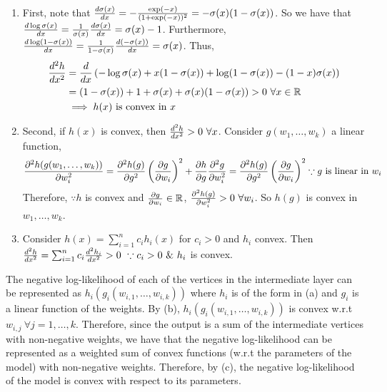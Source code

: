 

\begin{enumerate}
    \item First, note that $\odv{\sigma(x)}{x} = -\frac{\exp(-x)}{(1 + \exp(-x))^2} = -\sigma(x)(1 - \sigma(x))$. So we have that $\odv{\log\sigma(x)}{x} = \frac{1}{\sigma(x)}\odv{\sigma(x)}{x} = \sigma(x) - 1$. Furthermore, $\odv{\log(1-\sigma(x))}{x} = \frac{1}{1 - \sigma(x)}\odv{(-\sigma(x))}{x} = \sigma(x)$. Thus,
    \begin{align*}
        \odv[2]{h}{x} &= \odv{}{x} \left( -\log\sigma(x) + x(1 - \sigma(x)) +\log(1 - \sigma(x)) - (1-x) \sigma(x)  \right)\\
        &= (1 - \sigma(x)) + 1 + \sigma(x) + \sigma(x)(1 - \sigma(x)) > 0 ~\forall x \in \mathbb{R}\\
        &\implies h(x) ~\text{is convex in } x
    \end{align*}
    
    \item Second, if $h(x)$ is convex, then $\odv[2]{h}{x} > 0 ~\forall x$. Consider $g(w_1, \dots, w_k)$ a linear function,
     $$
     \pdv[2]{h(g(w_1, \dots, w_k))}{w_i} = \pdv[2]{h(g)}{g}\left(\pdv{g}{w_i}\right)^2 + \pdv{h}{g} \pdv[2]{g}{w_i} = \pdv[2]{h(g)}{g}\left(\pdv{g}{w_i}\right)^2 \because g ~\text{is linear in } w_i
     $$
     Therefore, $\because h$ is convex and $\pdv{g}{w_i} \in \mathbb{R}$, $\pdv[2]{h(g)}{w_i} > 0 ~\forall w_i$. So $h(g)$ is convex in $w_1, \dots, w_k$.
     
     \item Consider $h(x) = \sum_{i=1}^n c_i h_i(x)$ for $c_i > 0$ and $h_i$ convex. Then $\odv[2]{h}{x} = \sum_{i=1}^n c_i \odv[2]{h_i}{x} > 0 ~\because c_i > 0 ~\&~ h_i$ is convex.
\end{enumerate}
The negative log-likelihood of each of the vertices in the intermediate layer can be represented as $h_i(g_i(w_{i,1}, \dots, w_{i,k}))$ where $h_i$ is of the form in (a) and $g_i$ is a linear function of the weights. By (b), $h_i(g_i(w_{i,1}, \dots, w_{i,k}))$ is convex w.r.t $w_{i,j} ~\forall j = 1, \dots, k$. Therefore, since the output is a sum of the intermediate vertices with non-negative weights, we have that the negative log-likelihood can be represented as a weighted sum of convex functions (w.r.t the parameters of the model) with non-negative weights. Therefore, by (c), the negative log-likelihood of the model is convex with respect to its parameters.